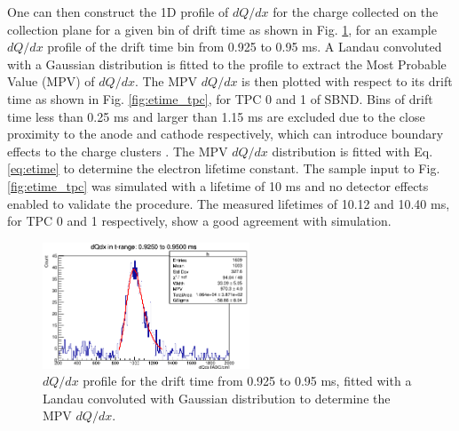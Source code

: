 One can then construct the 1D profile of $dQ/dx$ for the charge collected on the collection plane for a given bin of drift time as shown in Fig. \ref{fig:dqdxMPV}, for an example $dQ/dx$ profile of the drift
 time bin from 0.925 to 0.95 ms.                                                                                                                                                                       
A Landau convoluted with a Gaussian distribution \cite{Passage} is fitted to the profile to extract the Most Probable Value (MPV) of $dQ/dx$.                                 
The MPV $dQ/dx$ is then plotted with respect to its drift time as shown in Fig. \ref{fig:etime_tpc}, for TPC 0 and 1 of SBND.                                                                          
Bins of drift time less than 0.25 ms and larger than 1.15 ms are excluded due to the close proximity to the anode and cathode respectively, which can introduce boundary effects to the charge clusters
.                                                                                                                                                                                                      
The MPV $dQ/dx$ distribution is fitted with Eq. \ref{eq:etime} to determine the electron lifetime constant.                                                                                            
The sample input to Fig. \ref{fig:etime_tpc} was simulated with a lifetime of 10 ms and no detector effects enabled to validate the procedure.                                       
The measured lifetimes of 10.12 and 10.40 ms, for TPC 0 and 1 respectively, show a good agreement with simulation. 
\begin{figure}[htbp!] 
\centering    
\includegraphics[width=0.55\textwidth]{dqdxMPV}
\caption[dqdxMPV]{
$dQ/dx$ profile for the drift time from 0.925 to 0.95 ms, fitted with a Landau convoluted with Gaussian distribution to determine the MPV $dQ/dx$.
}
\label{fig:dqdxMPV}
\end{figure}

